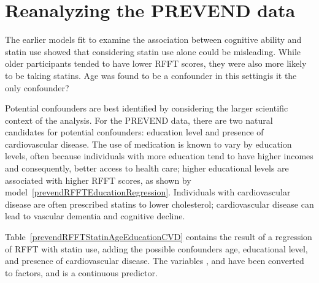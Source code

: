 \section{Reanalyzing the PREVEND data}
\label{reanalyzingStatinDataSet}

The earlier models fit to examine the association between cognitive ability and statin use showed that considering statin use alone could be misleading. While older participants tended to have lower RFFT scores, they were also more likely to be taking statins. Age was found to be a confounder in this setting\textemdash is it the only confounder?

Potential confounders are best identified by considering the larger scientific context of the analysis. For the PREVEND data, there are two natural candidates for potential confounders: education level and presence of cardiovascular disease. The use of medication is known to vary by education levels, often because individuals with more education tend to have higher incomes and consequently, better access to health care; higher educational levels are associated with higher RFFT scores, as shown by model~\ref{prevendRFFTEducationRegression}. Individuals with cardiovascular disease are often prescribed statins to lower cholesterol; cardiovascular disease can lead to vascular dementia and cognitive decline.

Table~\ref{prevendRFFTStatinAgeEducationCVD} contains the result of a regression of RFFT with statin use, adding the possible confounders age, educational level, and presence of cardiovascular disease. The variables ,  and  have been converted to factors, and  is a continuous predictor.

